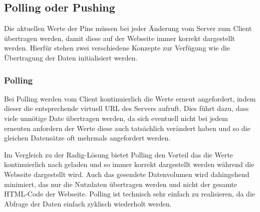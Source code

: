 
\subsection{Polling oder Pushing}
Die aktuellen Werte der Pins müssen bei jeder Änderung vom Server zum Client übertragen
werden, damit diese auf der Webseite immer korrekt dargestellt werden. Hierfür stehen zwei
verschiedene Konzepte zur Verfügung wie die Übertragung der Daten initialisiert werden.

\subsubsection{Polling}
Bei Polling werden vom Client kontinuierlich die Werte erneut angefordert, indem dieser
die entsprechende virtuell URL des Servers aufruft. Dies führt dazu, dass viele unnötige
Date übertragen werden, da sich eventuell nicht bei jedem erneuten anfordern der Werte
diese auch tatsächlich verändert haben und so die gleichen Datensätze oft mehrmals
angefordert werden.

Im Vergleich zu der Radig-Lösung bietet Polling den Vorteil das die Werte kontinuierlich
nach geladen und so immer korrekt dargestellt werden während die Webseite dargestellt
wird. Auch das gesendete Datenvolumen wird dahingehend minimiert, das nur die Nutzdaten
übertragen werden und nicht der gesamte HTML-Code der Webseite. Polling ist technisch sehr
einfach zu realisieren, da die Abfrage der Daten einfach zyklisch wiederholt werden.

